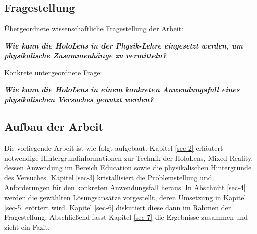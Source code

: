 \subsection{Fragestellung}
\label{sec-1-2}
Übergeordnete wissenschaftliche Fragestellung der Arbeit:
\begin{center}
	\textit{\textbf{Wie kann die HoloLens in der Physik-Lehre eingesetzt werden, um physikalische Zusammenhänge zu vermitteln?}}
\end{center}

Konkrete untergeordnete Frage:
\begin{center}
	\textit{\textbf{Wie kann die HoloLens in einem konkreten Anwendungsfall eines physikalischen Versuches genutzt werden?}}
\end{center}

\begin{comment}
\subsection{Aufgabenstellung}

Im Rahmen der Arbeit soll anhand der HoloLens untersucht werden, wie diese in der Physik-Lehre eingesetzt werden kann, um physikalische Inhalte zu vermitteln. Insbesondere soll betrachtet werden, wie physikalische Experimente mittels Mixed Reality Anwendungen durch zusätzliche Inhalte angereichert werden können.\\

\par
Dazu sind zunächst die technischen Möglichkeiten und Voraussetzungen der HoloLens zu betrachten und in Zusammenhang mit dem Anwendungsfall zu bringen. Weiterhin sind bestehende Ansätze im Einsatz von Mixed Reality Technologie in der Lehre, besonders in der Physik-Lehre, herauszuarbeiten und einzuordnen.

Davon ausgehend soll der Fragestellung anhand eines konkreten Beispiels nachgegangen werden. Für einen ausgewählten Versuchsaufbau sind die darzustellenden Objekte und Informationen sowie das Zusammenspiel dieser mit dem aufgebauten Experiment, der Umgebung und den Nutzern zu entwickeln. Für den ausgewählten Anwendungsfall soll eine Umsetzung mit der HoloLens konzipiert, designet und prototypisch implementiert werden.
\end{comment}

\subsection{Aufbau der Arbeit}
\label{sec-1-3}
Die vorliegende Arbeit ist wie folgt aufgebaut. Kapitel \ref{sec-2} erläutert notwendige Hintergrundinformationen zur Technik der HoloLens, Mixed Reality, dessen Anwendung im Bereich Education sowie die physikalischen Hintergründe des Versuches.  Kapitel \ref{sec-3} kristallisiert die Problemstellung und Anforderungen für den konkreten Anwendungsfall heraus. In Abschnitt \ref{sec-4} werden die gewählten Lösungsansätze vorgestellt, deren Umsetzung in Kapitel \ref{sec-5} erörtert wird. Kapitel \ref{sec-6} diskutiert diese dann im Rahmen der Fragestellung. Abschließend fasst Kapitel \ref{sec-7} die Ergebnisse zusammen und zieht ein Fazit.